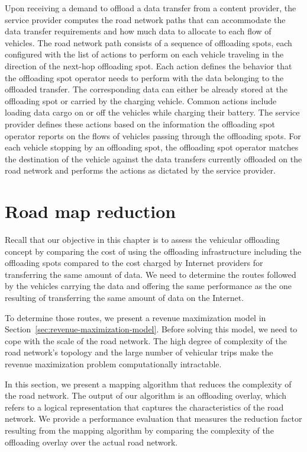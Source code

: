 Upon receiving a demand to offload a data transfer from a content provider, the service provider computes the road network paths that can accommodate the data transfer requirements and how much data to allocate to each flow of vehicles. The road network path consists of a sequence of offloading spots, each configured with the list of actions to perform on each vehicle traveling in the direction of the next-hop offloading spot. Each action defines the behavior that the offloading spot operator needs to perform with the data belonging to the offloaded transfer. The corresponding data can either be already stored at the offloading spot or carried by the charging vehicle. Common actions include loading data cargo on or off the vehicles while charging their battery. The service provider defines these actions based on the information the offloading spot operator reports on the flows of vehicles passing through the offloading spots. For each vehicle stopping by an offloading spot, the offloading spot operator matches the destination of the vehicle against the data transfers currently offloaded on the road network and performs the actions as dictated by the service provider. 

\section{Road map reduction}
\label{sec:offloading-overlay}

Recall that our objective in this chapter is to assess the vehicular offloading concept by comparing the cost of using the offloading infrastructure including the offloading spots compared to the cost charged by Internet providers for transferring the same amount of data. We need to determine the routes followed by the vehicles carrying the data and offering the same performance as the one resulting of transferring the same amount of data on the Internet. 

To determine those routes, we present a revenue maximization model in Section~\ref{sec:revenue-maximization-model}. Before solving this model, we need to cope with the scale of the road network. The high degree of complexity of the road network's topology and the large number of vehicular trips make the revenue maximization problem computationally intractable.

In this section, we present a mapping algorithm that reduces the complexity of the road network. The output of our algorithm is an offloading overlay, which refers to a logical representation that captures the characteristics of the road network. We provide a performance evaluation that measures the reduction factor resulting from the mapping algorithm by comparing the complexity of the offloading overlay over the actual road network.


